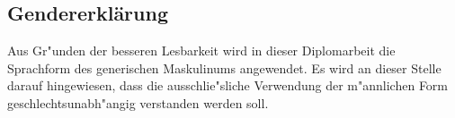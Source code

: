 \documentclass[12pt,a4paper]{article}
\begin{document}
\subsection*{Gendererklärung}
	Aus Gr"unden der besseren Lesbarkeit wird in dieser Diplomarbeit die Sprachform
	des generischen Maskulinums angewendet. Es wird an dieser Stelle darauf
	hingewiesen, dass die ausschlie"sliche Verwendung der m"annlichen Form
	geschlechtsunabh"angig verstanden werden soll.
%
%
\newpage
%
%
%
%
\end{document}
